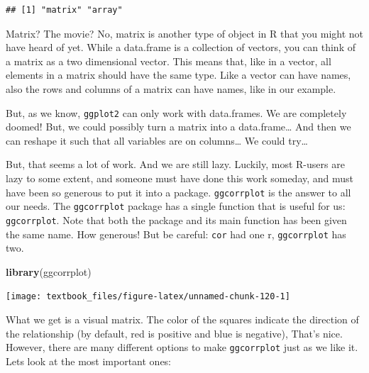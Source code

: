 \documentclass[]{tufte-book}
\newenvironment{Shaded}{}{}
\newcommand{\KeywordTok}[1]{\textcolor[rgb]{0.00,0.44,0.13}{\textbf{#1}}}
\newcommand{\NormalTok}[1]{#1}
\newcommand{\OperatorTok}[1]{\textcolor[rgb]{0.40,0.40,0.40}{#1}}
\newcommand{\StringTok}[1]{\textcolor[rgb]{0.25,0.44,0.63}{#1}}
\begin{document}
\begin{verbatim}
## [1] "matrix" "array"
\end{verbatim}

Matrix? The movie? No, matrix is another type of object in R that you might not have heard of yet. While a data.frame is a collection of vectors, you can think of a matrix as a two dimensional vector. This means that, like in a vector, all elements in a matrix should have the same type. Like a vector can have names, also the rows and columns of a matrix can have names, like in our example.

But, as we know, \texttt{ggplot2} can only work with data.frames. We are completely doomed! But, we could possibly turn a matrix into a data.frame\ldots{} And then we can reshape it such that all variables are on columns\ldots{} We could try\ldots{}

But, that seems a lot of work. And we are still lazy. Luckily, most R-users are lazy to some extent, and someone must have done this work someday, and must have been so generous to put it into a package. \texttt{ggcorrplot} is the answer to all our needs. The \texttt{ggcorrplot} package has a single function that is useful for us: \texttt{ggcorrplot}. Note that both the package and its main function has been given the same name. How generous! But be careful: \texttt{cor} had one r, \texttt{ggcorrplot} has two.

\begin{Shaded}
\begin{Highlighting}[]
\KeywordTok{library}\NormalTok{(ggcorrplot)}
\end{Highlighting}
\end{Shaded}

\begin{Shaded}
\end{Shaded}

\texttt{[image: textbook\_files/figure-latex/unnamed-chunk-120-1]}

What we get is a visual matrix. The color of the squares indicate the direction of the relationship (by default, red is positive and blue is negative), That's nice. However, there are many different options to make \texttt{ggcorrplot} just as we like it. Lets look at the most important ones:
\end{document}
